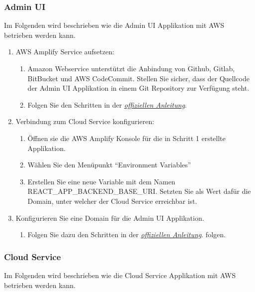 \subsubsection*{Admin UI}

Im Folgenden wird beschrieben wie die Admin UI Applikation mit AWS betrieben werden kann.

\begin{enumerate}
    \item AWS Amplify Service aufsetzen:
    \begin{enumerate}
        \item Amazon Webservice unterstützt die Anbindung von Github, Gitlab, BitBucket und AWS CodeCommit. Stellen Sie sicher, dass der Quellcode der Admin UI Applikation in einem Git Repository zur Verfügung steht.
        \item Folgen Sie den Schritten in der \href{https://docs.aws.amazon.com/amplify/latest/userguide/getting-started.html}{\textit{offiziellen Anleitung}}.\cite{aws-amplify}
    \end{enumerate}
    \item Verbindung zum Cloud Service konfigurieren:
    \begin{enumerate}
        \item Öffnen sie die AWS Amplify Konsole für die in Schritt 1 erstellte Applikation.
        \item Wählen Sie den Menüpunkt ``Environment Variables''
        \item Erstellen Sie eine neue Variable mit dem Namen REACT\_APP\_BACKEND\_BASE\_URI. Setzten Sie als Wert dafür die Domain, unter welcher der Cloud Service erreichbar ist.
    \end{enumerate}
    \item Konfigurieren Sie eine Domain für die Admin UI Applikation.
    \begin{enumerate}
        \item Folgen Sie dazu den Schritten in der \href{https://docs.aws.amazon.com/amplify/latest/userguide/custom-domains.html}{\textit{offiziellen Anleitung}}.\cite{aws-amplify-domain} folgen.
    \end{enumerate}
\end{enumerate}

\subsubsection*{Cloud Service}

Im Folgenden wird beschrieben wie die Cloud Service Applikation mit AWS betrieben werden kann.


